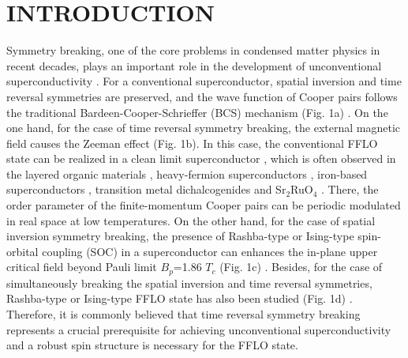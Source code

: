\documentclass[%
 reprint,
superscriptaddress,
 amsmath,amssymb,
 aps,
]{revtex4-2}
\begin{document}
\maketitle


\section{INTRODUCTION}


Symmetry breaking, one of the core problems in condensed matter physics in recent decades, plays an important role in the development of unconventional superconductivity \cite{TSC, Iron}. For a conventional superconductor, spatial inversion and time reversal symmetries are preserved, and the wave function of Cooper pairs follows the traditional Bardeen-Cooper-Schrieffer (BCS) mechanism (Fig. 1a) \cite{BCS}. On the one hand, for the case of time reversal symmetry breaking, the external magnetic field causes the Zeeman effect (Fig. 1b). In this case, the conventional FFLO state can be realized in a clean limit superconductor \cite{FF, LO, FFLOclean1, FFLOclean2, FFLO_PRX}, which is often observed in the layered organic materials \cite{FFLOin2D, Organic}, heavy-fermion superconductors \cite{Heavy3, Heavy1, Heavy2}, iron-based superconductors \cite{KFeAs, FeSe,FeSe2}, transition metal dichalcogenides \cite{NbS2} and Sr$_2$RuO$_4$ \cite{SRO}. There, the order parameter of the finite-momentum Cooper pairs can be periodic modulated in real space at low temperatures. On the other hand, for the case of spatial inversion symmetry breaking, the presence of Rashba-type or Ising-type spin-orbital coupling (SOC) in a superconductor can enhances the in-plane upper critical field beyond Pauli limit $B_p$=1.86 $T_c$ (Fig. 1c) \cite{non-centrosymmetric, Ising, Crossover}. Besides, for the case of simultaneously breaking the spatial inversion and time reversal symmetries, Rashba-type or Ising-type FFLO state has also been studied (Fig. 1d) \cite{FFLOPNAS, Orbital, FFLOinIsing, FFLOinRashba}. Therefore, it is commonly believed that time reversal symmetry breaking represents a crucial prerequisite for achieving unconventional superconductivity and a robust spin structure is necessary for the FFLO state. 
\end{document}
